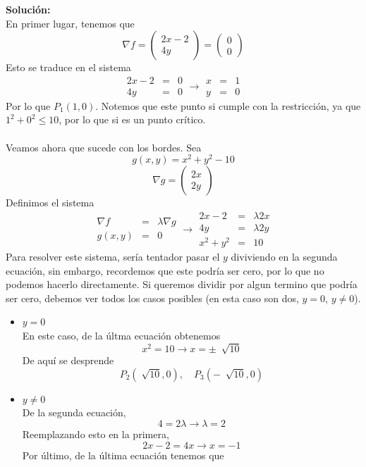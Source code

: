 \documentclass[12pt]{article}
\newenvironment{solucion}
{\begin{mdframed}[backgroundcolor=black!10]
		{\bf Solución:}\\
	}
	{
	\end{mdframed}
}
\newenvironment{preguntas}
{\begin{enumerate}\itemsep12pt
	}
	{
	\end{enumerate}
}
\newcommand{\ra}{\rightarrow}
\begin{document}
\begin{preguntas}
\begin{solucion}
En primer lugar, tenemos que
$$\nabla f = \begin{pmatrix} 2x - 2 \\ 4y \end{pmatrix} = \begin{pmatrix} 0 \\ 0 \end{pmatrix}$$
Esto se traduce en el sistema
$$\begin{array}{rcl} 2x-2 & = & 0 \\ 4y & = & 0 \end{array}
\ra 
\begin{array}{rcl} x & = & 1 \\ y & = & 0 \end{array}$$
Por lo que $P_1(1,0)$. Notemos que este punto si cumple con la restricción, ya que $1^2 + 0^2 \leq 10$, por lo que si es un punto crítico.\\
\\
Veamos ahora que sucede con los bordes. Sea
$$g(x,y) = x^2 + y^2 - 10$$
$$\nabla g = \begin{pmatrix} 2x \\ 2y \end{pmatrix}$$
Definimos el sistema
$$\begin{array}{rcl} \nabla f & = & \lambda \nabla g \\ g(x,y) & = & 0 \end{array}
\ra 
\begin{array}{rcl}
2x-2 & = & \lambda 2x \\
4y & = & \lambda 2y \\
x^2+y^2 & = & 10
\end{array}$$
Para resolver este sistema, sería tentador pasar el $y$ diviviendo en la segunda ecuación, sin embargo, recordemos que este podría ser cero, por lo que no podemos hacerlo directamente. Si queremos dividir por algun termino que podría ser cero, debemos ver todos los casos posibles (en esta caso son dos, $y = 0$, $y \neq 0$).
\begin{itemize}
\item $y = 0$\\
En este caso, de la últma ecuación obtenemos
$$x^2 = 10 \ra x = \pm \ \sqrt[]{10}$$
De aquí se desprende
$$P_2(\sqrt[]{10}, 0), \quad P_3(-\ \sqrt[]{10}, 0)$$
\item $y \neq 0$\\
De la segunda ecuación,
$$4 = 2\lambda \ra \lambda = 2$$
Reemplazando esto en la primera,
$$2x - 2 = 4x \ra x = -1$$
Por último, de la última ecuación tenemos que

\end{itemize}
\end{solucion}
\end{preguntas}
\end{document}
